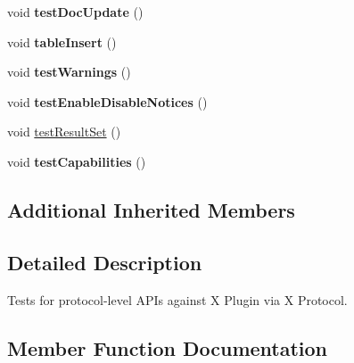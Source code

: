 \begin{DoxyCompactItemize}
void {\bfseries test\+Doc\+Update} ()
\item 
\mbox{\label{classtestsuite_1_1x_1_1internal_1_1_x_protocol_test_a4b1f929b40ce724506a6671f46917204}} 
void {\bfseries table\+Insert} ()
\item 
\mbox{\label{classtestsuite_1_1x_1_1internal_1_1_x_protocol_test_a6f54c8fce78c6b4a5b499b75fb12a897}} 
void {\bfseries test\+Warnings} ()
\item 
\mbox{\label{classtestsuite_1_1x_1_1internal_1_1_x_protocol_test_a4fdf5f8b9d2e733db22b09e38b240eb5}} 
void {\bfseries test\+Enable\+Disable\+Notices} ()
\item 
void \mbox{\hyperlink{classtestsuite_1_1x_1_1internal_1_1_x_protocol_test_adbaeaa413b4fecde68b32c0c8d609ddc}{test\+Result\+Set}} ()
\item 
\mbox{\label{classtestsuite_1_1x_1_1internal_1_1_x_protocol_test_ac51527155cb0b1a12790c658a10648b3}} 
void {\bfseries test\+Capabilities} ()
\end{DoxyCompactItemize}
\subsection*{Additional Inherited Members}


\subsection{Detailed Description}
Tests for protocol-\/level A\+P\+Is against X Plugin via X Protocol. 

\subsection{Member Function Documentation}
\mbox{\label{classtestsuite_1_1x_1_1internal_1_1_x_protocol_test_a650f7b5f38eedab82e4ef98ce22cf095}} 
